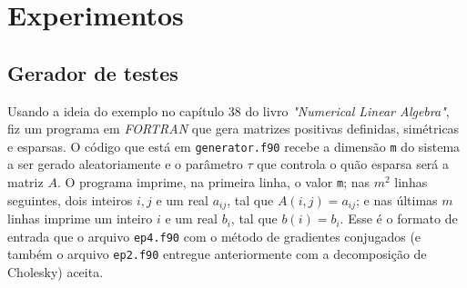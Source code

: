 \documentclass[a4paper,11pt]{article}
\begin{document}
    \section{Experimentos}
        \subsection{Gerador de testes}
            Usando a ideia do exemplo no capítulo 38 do livro \textit{"Numerical Linear Algebra"}, fiz um programa em \textit{FORTRAN} que gera matrizes positivas definidas, simétricas e esparsas. O código que está em \texttt{generator.f90} recebe a dimensão \texttt{m} do sistema a ser gerado aleatoriamente e o parâmetro $\tau$ que controla o quão esparsa será a matriz $A$. O programa imprime, na primeira linha, o valor \texttt{m}; nas $m^2$ linhas seguintes, dois inteiros $i,j$ e um real $a_{ij}$, tal que $A(i,j)=a_{ij}$; e nas últimas $m$ linhas imprime um inteiro $i$ e um real $b_i$, tal que $b(i)=b_i$. Esse é o formato de entrada que o arquivo \texttt{ep4.f90} com o método de gradientes conjugados (e também o arquivo \texttt{ep2.f90} entregue anteriormente com a decomposição de Cholesky) aceita.
        
\end{document}
